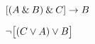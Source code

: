 \begin{earg}
\item $[(A \mathbin{\&} B) \mathbin{\&} C] \rightarrow B$\vspace{.5ex}							
%
%
%

\item ${\neg}\bigl[(C\vee A) \vee B\bigr]$\vspace{.5ex} 						
%
%
%


\end{earg}

